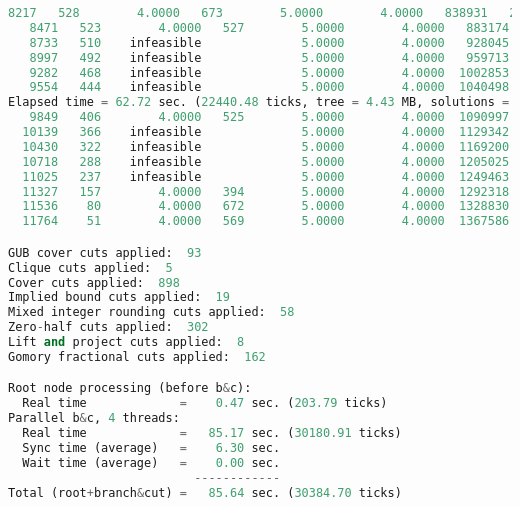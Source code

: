 \begin{lstlisting}[language=Python]
   8217   528        4.0000   673        5.0000        4.0000   838931   20.00%
   8471   523        4.0000   527        5.0000        4.0000   883174   20.00%
   8733   510    infeasible              5.0000        4.0000   928045   20.00%
   8997   492    infeasible              5.0000        4.0000   959713   20.00%
   9282   468    infeasible              5.0000        4.0000  1002853   20.00%
   9554   444    infeasible              5.0000        4.0000  1040498   20.00%
Elapsed time = 62.72 sec. (22440.48 ticks, tree = 4.43 MB, solutions = 1)
   9849   406        4.0000   525        5.0000        4.0000  1090997   20.00%
  10139   366    infeasible              5.0000        4.0000  1129342   20.00%
  10430   322    infeasible              5.0000        4.0000  1169200   20.00%
  10718   288    infeasible              5.0000        4.0000  1205025   20.00%
  11025   237    infeasible              5.0000        4.0000  1249463   20.00%
  11327   157        4.0000   394        5.0000        4.0000  1292318   20.00%
  11536    80        4.0000   672        5.0000        4.0000  1328830   20.00%
  11764    51        4.0000   569        5.0000        4.0000  1367586   20.00%

GUB cover cuts applied:  93
Clique cuts applied:  5
Cover cuts applied:  898
Implied bound cuts applied:  19
Mixed integer rounding cuts applied:  58
Zero-half cuts applied:  302
Lift and project cuts applied:  8
Gomory fractional cuts applied:  162

Root node processing (before b&c):
  Real time             =    0.47 sec. (203.79 ticks)
Parallel b&c, 4 threads:
  Real time             =   85.17 sec. (30180.91 ticks)
  Sync time (average)   =    6.30 sec.
  Wait time (average)   =    0.00 sec.
                          ------------
Total (root+branch&cut) =   85.64 sec. (30384.70 ticks)

\end{lstlisting}